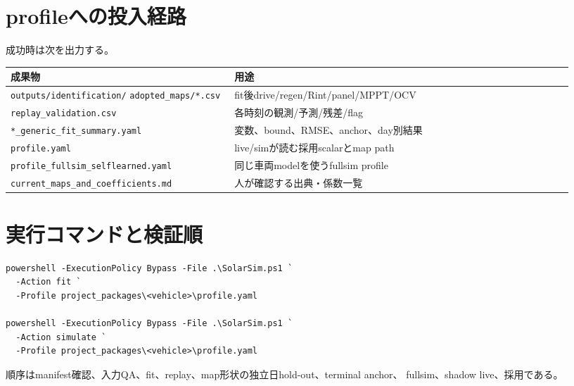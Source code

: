 

\section{profileへの投入経路}
成功時は次を出力する。
\begin{longtable}{p{0.37\linewidth}p{0.56\linewidth}}
\toprule
成果物&用途\\\midrule\endhead
\nolinkurl{outputs/identification/}\newline
\nolinkurl{adopted_maps/*.csv}&fit後drive/regen/Rint/panel/MPPT/OCV\\
\texttt{replay\_validation.csv}&各時刻の観測/予測/残差/flag\\
\texttt{*\_generic\_fit\_summary.yaml}&変数、bound、RMSE、anchor、day別結果\\
\texttt{profile.yaml}&live/simが読む採用scalarとmap path\\
\texttt{profile\_fullsim\_selflearned.yaml}&同じ車両modelを使うfullsim profile\\
\texttt{current\_maps\_and\_coefficients.md}&人が確認する出典・係数一覧\\
\bottomrule
\end{longtable}


\section{実行コマンドと検証順}
\begin{lstlisting}
powershell -ExecutionPolicy Bypass -File .\SolarSim.ps1 `
  -Action fit `
  -Profile project_packages\<vehicle>\profile.yaml

powershell -ExecutionPolicy Bypass -File .\SolarSim.ps1 `
  -Action simulate `
  -Profile project_packages\<vehicle>\profile.yaml
\end{lstlisting}
順序はmanifest確認、入力QA、fit、replay、map形状の独立日hold-out、terminal anchor、
fullsim、shadow live、採用である。

